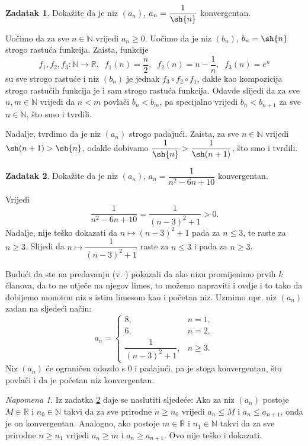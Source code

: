 \documentclass{book}
\renewenvironment{proof}{%
    \vspace{-\parskip}\begin{oldproof}%
    }{%
    \end{oldproof}%
}
\theoremstyle{definition}
\theoremstyle{definition}
\newtheorem{exercise}{Zadatak}
\theoremstyle{remark}
\newtheorem{remark}{Napomena}
\begin{document}
\begin{exercise}
Dokažite da je niz $(a_n)$, $a_n=\dfrac{1}{\sh{n}}$ konvergentan.
\end{exercise}
\begin{proof}[Rješenje]
Uočimo da za sve $n\in \mathbb{N}$ vrijedi $a_n\geq 0$. Uočimo da je niz $(b_n)$, $b_n=\sh{n}$ strogo rastuća funkcija. Zaista, funkcije $$f_1, f_2, f_3 : \mathbb{N}\to \mathbb{R},\;\;f_1(n)=\dfrac{n}{2},\;\;f_2(n)=n-\dfrac{1}{n},\;\;f_3(n)=e^n$$ su sve strogo rastuće i niz $(b_n)$ je jednak $f_3\circ f_2\circ f_1$, dakle kao kompozicija strogo rastućih funkcija je i sam strogo rastuća funkcija. Odavde slijedi da za sve $n, m\in \mathbb{N}$ vrijedi da $n<m$ povlači $b_n<b_m$, pa specijalno vrijedi $b_n<b_{n+1}$ za sve $n\in \mathbb{N}$, što smo i tvrdili.

Nadalje, tvrdimo da je niz $(a_n)$ strogo padajući. Zaista, za sve $n\in \mathbb{N}$ vrijedi $\sh(n+1)>\sh{n}$, odakle dobivamo $\dfrac{1}{\sh{n}}>\dfrac{1}{\sh(n+1)}$, što smo i tvrdili.
\end{proof}
\begin{exercise}
\label{8}
Dokažite da je niz $(a_n)$, $a_n=\dfrac{1}{n^2-6n+10}$ konvergentan.
\end{exercise}
\begin{proof}[Rješenje]
Vrijedi
$$\dfrac{1}{n^2-6n+10}=\dfrac{1}{(n-3)^2+1}>0.$$ Nadalje, nije teško dokazati da $n\mapsto (n-3)^2+1$ pada za $n\leq 3$, te raste za $n\geq 3$. Slijedi da $n\mapsto \dfrac{1}{(n-3)^2+1}$ raste za $n\leq 3$ i pada za $n\geq 3$. 

Budući da ste na predavanju (v. \cite{3}) pokazali da ako nizu promijenimo prvih $k$ članova, da to ne utječe na njegov limes, to možemo napraviti i ovdje i to tako da dobijemo monoton niz s istim limesom kao i početan niz. Uzmimo npr. niz $(a_n)$ zadan na sljedeći način: 
$$a_n=\begin{cases}
8, & n=1,\\
6, & n=2,\\
\dfrac{1}{(n-3)^2+1}, & n\geq 3.
\end{cases}$$ 
Niz $(a_n)$ će ograničen odozdo s $0$ i padajući, pa je stoga konvergentan, što povlači i da je početan niz konvergentan.
\end{proof}
\begin{remark}
\label{generalizedsandwichtheorem}
Iz zadatka \ref{8} daje se naslutiti sljedeće: Ako za niz $(a_n)$ postoje $M\in \mathbb{R}$ i $n_0\in \mathbb{N}$ takvi da za sve prirodne $n\geq n_0$ vrijedi $a_n\leq M$ i $a_{n}\leq a_{n+1}$, onda je on konvergentan. Analogno, ako postoje $m\in \mathbb{R}$ i $n_1\in \mathbb{N}$ takvi da za sve prirodne $n\geq n_1$ vrijedi $a_n\geq m$ i $a_{n}\geq a_{n+1}$. Ovo nije teško i dokazati.
\end{remark}
\end{document}
